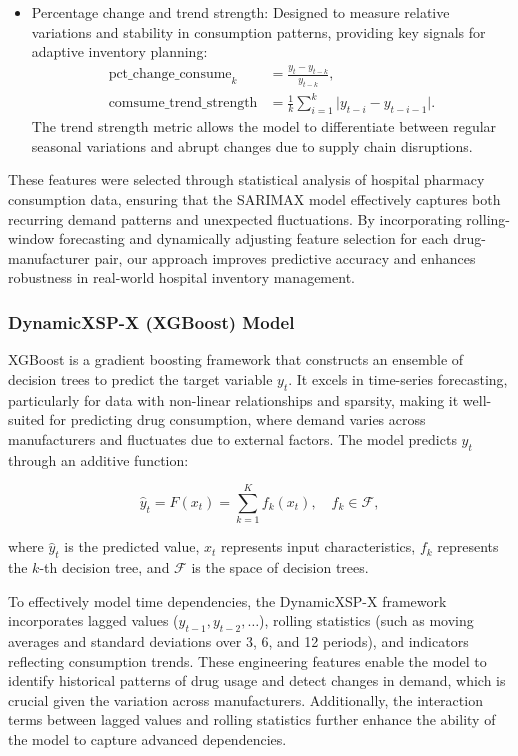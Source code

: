 \documentclass[12pt]{article}
\begin{document}
\begin{itemize}
    \item Percentage change and trend strength: Designed to measure relative variations and stability in consumption patterns, providing key signals for adaptive inventory planning:
    \begin{align}
    \text{pct\_change\_consume}_{k} &= \frac{y_{t} - y_{t-k}}{y_{t-k}}, \\
    \text{comsume\_trend\_strength} &= \frac{1}{k} \sum_{i=1}^{k} \lvert y_{t-i} - y_{t-i-1} \rvert.
    \end{align}
    The trend strength metric allows the model to differentiate between regular seasonal variations and abrupt changes due to supply chain disruptions.
\end{itemize}

These features were selected through statistical analysis of hospital pharmacy consumption data, ensuring that the SARIMAX model effectively captures both recurring demand patterns and unexpected fluctuations. By incorporating rolling-window forecasting and dynamically adjusting feature selection for each drug-manufacturer pair, our approach improves predictive accuracy and enhances robustness in real-world hospital inventory management.

\subsubsection{DynamicXSP-X (XGBoost) Model}

XGBoost is a gradient boosting framework that constructs an ensemble of decision trees to predict the target variable \(y_t\). It excels in time-series forecasting, particularly for data with non-linear relationships and sparsity, making it well-suited for predicting drug consumption, where demand varies across manufacturers and fluctuates due to external factors. The model predicts \(y_t\) through an additive function:

\begin{equation}
\hat{y}_{t} = F(x_{t}) = \sum_{k=1}^{K} f_{k}(x_{t}), \quad f_{k} \in \mathcal{F},
\end{equation}

where \(\hat{y}_{t}\) is the predicted value, \(x_{t}\) represents input characteristics, \(f_{k}\) represents the \(k\)-th decision tree, and \(\mathcal{F}\) is the space of decision trees.

To effectively model time dependencies, the DynamicXSP-X framework incorporates lagged values (\(y_{t-1}, y_{t-2}, \dots\)), rolling statistics (such as moving averages and standard deviations over 3, 6, and 12 periods), and indicators reflecting consumption trends. These engineering features enable the model to identify historical patterns of drug usage and detect changes in demand, which is crucial given the variation across manufacturers. Additionally, the interaction terms between lagged values and rolling statistics further enhance the ability of the model to capture advanced dependencies.
\end{document}
